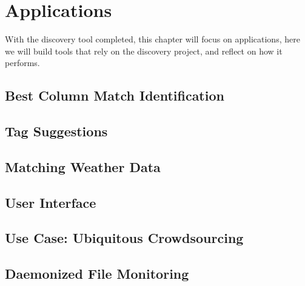 \chapter{Applications}\label{ch:applications}
With the discovery tool completed, this chapter will focus on applications, here we will build tools that rely on the
discovery project, and reflect on how it performs.


\section{Best Column Match Identification}\label{sec:best-column-match-id}



\section{Tag Suggestions}\label{sec:tag-suggestions}



\section{Matching Weather Data}\label{sec:matching-weather-data}



\section{User Interface}\label{sec:user-interface}



\section{Use Case: Ubiquitous Crowdsourcing}\label{sec:ubiquitous-crowdsourcing}



\section{Daemonized File Monitoring}\label{sec:daemonized-file-monitoring}


